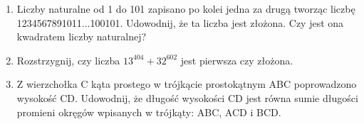\documentclass[10pt]{article}
\begin{document}
\begin{enumerate}
  \item Liczby naturalne od 1 do 101 zapisano po kolei jedna za drugą tworząc liczbę 1234567891011...100101. Udowodnij, że ta liczba jest złożona. Czy jest ona kwadratem liczby naturalnej?
  \item Rozstrzygnij, czy liczba \(13^{404}+32^{602}\) jest pierwsza czy złożona.
  \item Z wierzchołka C kąta prostego w trójkącie prostokątnym ABC poprowadzono wysokość CD. Udowodnij, że długość wysokości CD jest równa sumie długości promieni okręgów wpisanych w trójkąty: ABC, ACD i BCD.
\end{enumerate}
\end{document}
